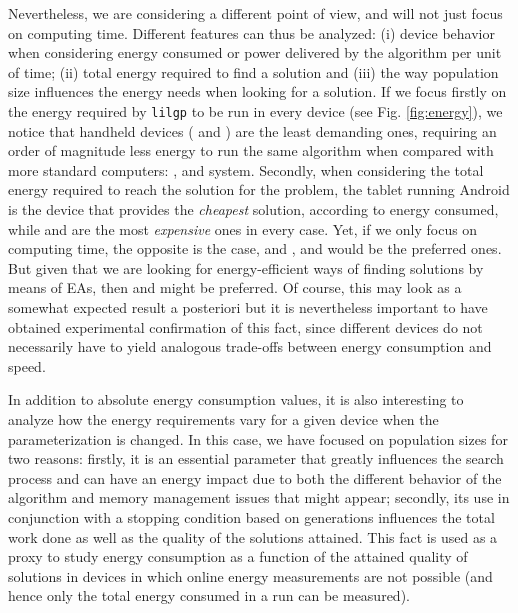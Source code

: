 Nevertheless, we are considering a different point of view, and will
not just focus on computing time.  Different features can thus be
analyzed:  (i) device behavior when considering energy consumed or power delivered by the
algorithm per unit of time; (ii) total energy required to find a
solution and (iii) the way population size influences the energy needs
when looking for a solution. If we focus firstly on the energy
required by {\tt lilgp} to be run in every device (see
Fig. \ref{fig:energy}), we notice that  handheld devices (\raspberry
and \tabletnsp) are the least demanding ones, requiring an order of
magnitude less energy to run the same algorithm when compared with
more standard computers:  \iMacnsp, \laptop and \blade
system. Secondly, when considering the total energy required to reach
the solution for the problem, the tablet running Android is the device
that provides the \emph{cheapest} solution, according to energy
consumed, while \blade and \laptop are the most \emph{expensive} ones
in every case.  Yet, if we only focus on computing time, the
opposite is the case, and \iMacnsp, \laptop and \blade would be the
preferred ones.  But given that we are looking for energy-efficient
ways of finding solutions by means of EAs, then \raspberry and \tablet
might be preferred. Of course, this may look as a somewhat expected
result a posteriori but it is nevertheless important to have obtained experimental
confirmation of this fact, since different devices do not necessarily have
to yield analogous trade-offs between energy consumption and speed. 

In addition to absolute energy consumption values, it is also interesting to analyze
how the energy requirements vary for a given device when the parameterization
is changed. In this case, we have focused on population sizes for two reasons:
firstly, it is an essential parameter that greatly influences the search process and
can have an energy impact due to both the different behavior of the algorithm and
memory management issues that might appear; secondly, its use in conjunction
with a stopping condition based on generations influences the total work done as
well as the quality of the solutions attained. This fact is used as a proxy to study
energy consumption as a function of the attained quality of solutions in devices in which
online energy measurements are not possible (and hence only the total energy 
consumed in a run can be measured). 

